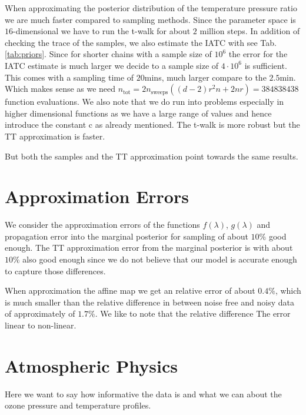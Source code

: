 When approximating the posterior distribution of the temperature pressure ratio we are much faster compared to sampling methods.
Since the parameter space is $16$-dimensional we have to run the t-walk for about $2$ million steps.
In addition of checking the trace of the samples, we also estimate the IATC with \cite{UwerrM} see Tab. \ref{tab:priors}.
Since for shorter chains with a sample size of $10^6$ the error for the IATC estimate is much larger we decide to a sample size of $4 \cdot 10^6$ is sufficient.
This comes with a sampling time of $20$mins, much larger compare to the $2.5$min.
Which makes sense as we need $n_{\text{tot}} = 2n_{\text{sweeps}}((d-2)r^2n+ 2nr) = 384838438$ function evaluations.
We also note that we do run into problems especially in higher dimensional functions as we have a large range of values and hence introduce the constant c as already mentioned.
The t-walk is more robust but the TT approximation is faster.

But both the samples and the TT approximation point towards the same results.


\section{Approximation Errors}
We consider the approximation errors of the functions $f(\lambda)$, $g(\lambda)$ and propagation error into the marginal posterior for sampling of about $10\%$ good enough.
The TT approximation error from the marginal posterior is with about $10\%$ also good enough since we do not believe that our model is accurate enough to capture those differences.

When approximation the affine map we get an relative error of about $0.4\%$, which is much smaller than the relative difference in between noise free and noisy data of approximately of $1.7 \%$.
We like to note that the relative difference 
The error linear to non-linear.

\section{Atmospheric Physics}
Here we want to say how informative the data is and what we can about the ozone pressure and temperature profiles.

